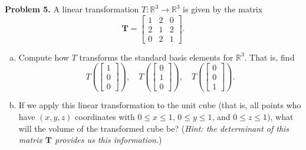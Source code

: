\documentclass[12pt]{report} %
\newcommand{\R}{\mathbb{R}}
\theoremstyle{definition}
\begin{document}
\noindent\textbf{Problem 5.} A linear transformation $T\colon \R^3 \to \R^3$ is given by the matrix
\[
\mathbf{T}= \begin{bmatrix}
1& 2& 0\\
2& 1& 2\\
0& 2& 1
\end{bmatrix}.
\]
\begin{enumerate}[(a)]
    \item Compute how $T$ transforms the standard basis elements for $\R^3$. That is, find
    \[
    T\left(\begin{bmatrix} 1\\ 0\\ 0\end{bmatrix}\right), \quad
    T\left(\begin{bmatrix} 0\\ 1\\ 0\end{bmatrix}\right), \quad 
    T\left(\begin{bmatrix} 0\\ 0\\ 1\end{bmatrix}\right).
    \]
    \item If we apply this linear transformation to the unit cube (that is, all points who have $(x,y,z)$ coordinates with $0\leq x \leq 1$, $0\leq y \leq 1$, and $0\leq z \leq 1$), what will the volume of the transformed cube be? (\emph{Hint: the determinant of this matrix $\mathbf{T}$ provides us this information.})
\end{enumerate}
\end{document}
